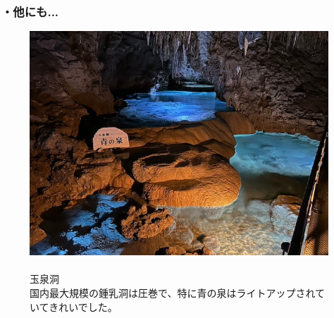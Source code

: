 \documentclass[../main]{subfiles}
\begin{document}
\subsubsection*{・他にも...}
\begin{figure}[H]
  \begin{minipage}[b]{0.48\columnwidth}
    \centering
    \includegraphics[width=\columnwidth]{figure/tamasendou.jpg}
  \end{minipage}
  \hspace{0.04\columnwidth} %
  \begin{minipage}[b]{0.48\columnwidth}
    \caption{\\
    玉泉洞\\
    国内最大規模の鍾乳洞は圧巻で、特に青の泉はライトアップされていてきれいでした。
    }
  \end{minipage}
\end{figure}
\end{document}
